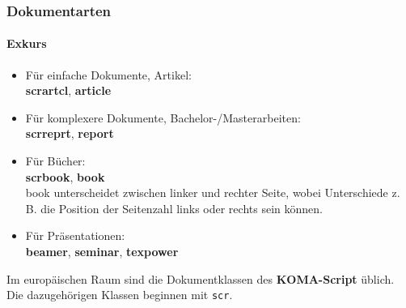\begin{frame}
\frametitle{Dokumentarten}
\framesubtitle{Exkurs}

\begin{itemize}

\item Für einfache Dokumente, Artikel:\\
\textbf{scrartcl}, \textbf{article}\\

\item Für komplexere Dokumente, Bachelor-/Masterarbeiten:\\
\textbf{scrreprt}, \textbf{report}\\

\item Für Bücher:\\
\textbf{scrbook}, \textbf{book}\\
{\ttfamily book} unterscheidet zwischen linker und rechter Seite, wobei Unterschiede z. B. die Position der Seitenzahl links oder rechts sein können.

\item Für Präsentationen:\\
\textbf{beamer}, \textbf{seminar}, \textbf{texpower}\\
\vspace{0.5cm}

\end{itemize}

Im europäischen Raum sind die Dokumentklassen des \textbf{KOMA-Script} üblich. Die dazugehörigen Klassen beginnen mit \texttt{scr}.\\
\end{frame}


